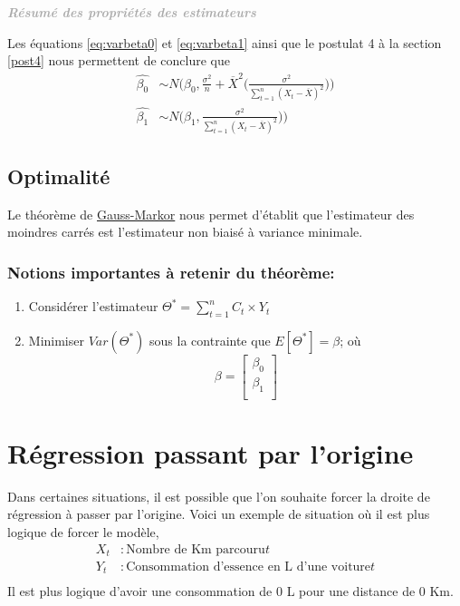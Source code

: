 \documentclass[11pt,french]{report}
\newenvironment{moreInfo}[1]
	{\begin{mdframed}
	\textcolor{darkgray}{\huge \raisebox{-3.5pt}{\faInfo} 
	\hspace{0.5cm} \large\bfseries #1}\\[5pt]
	\normalsize
	\makebox[0.1\textwidth][l]{}	
	\begin{minipage}{10cm}}
	{	\end{minipage}
	\end{mdframed}}
\begin{document}
\bigskip
\begin{moreInfo}{\emph{Résumé des propriétés des estimateurs}}
\label{res:estima}
	Les équations \ref{eq:varbeta0} et \ref{eq:varbeta1}  ainsi que le postulat 4 à la section \ref{post4} nous permettent de conclure que 
	\begin{align*}
	     \hat{\beta_0} &\sim N\Bigg(\beta_0, \frac{\sigma^2}{n}  + \overline{X}^2 \bigg(\frac{\sigma^2}{\displaystyle\sum_{t=1}^n (X_t - \overline{X})^2}\bigg)\Bigg) \\
	     \hat{\beta_1} &\sim N\Bigg(\beta_1, \frac{\sigma^2}{\displaystyle\sum_{t=1}^n(X_t - \overline{X})^2})\Bigg)
	\end{align*}

\end{moreInfo}
\bigskip

\subsection{Optimalité}
Le théorème de \href{https://fr.wikipedia.org/wiki/Théorème_de_Gauss-Markov}{Gauss-Markor} nous permet d'établit que l'estimateur des moindres carrés est l'estimateur non biaisé à variance minimale. 

\subsubsection*{Notions importantes à retenir du théorème:}
\begin{enumerate}
\item Considérer l'estimateur $\Theta^* = \displaystyle\sum_{t=1}^n C_t \times Y_t$
\item Minimiser $Var(\Theta^*)$ sous la contrainte que $E[\Theta^*] = \beta$; où
$$ \beta =
\begin{bmatrix}
  \beta_0 \\
  \beta_1 \\ 
\end{bmatrix} $$
\end{enumerate}

\section{Régression passant par l'origine}
Dans certaines situations, il est possible que l'on souhaite forcer la droite de régression à passer par l'origine.
Voici un exemple de situation où il est plus logique de forcer le modèle,
\begin{align*}
X_t &: \text{Nombre de Km parcouru} t \\
Y_t &: \text{Consommation d'essence en L d'une voiture} t\\
\end{align*}
Il est plus logique d'avoir une consommation de 0 L pour une distance de 0 Km.
\end{document}
